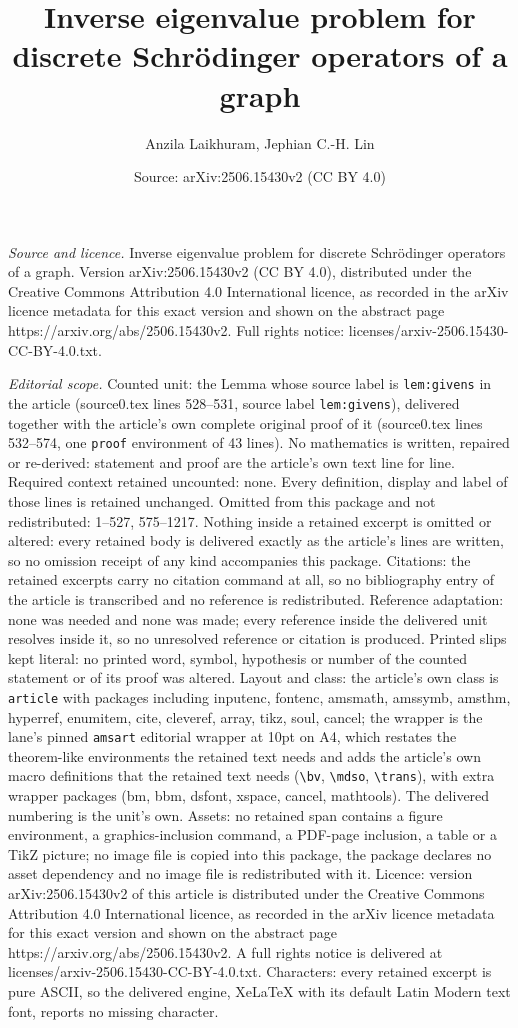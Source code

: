 \documentclass[10pt,a4paper]{amsart}
\title[Inverse eigenvalue problem for discrete Schr\"odinger operat]{Inverse eigenvalue problem for discrete Schr\"odinger operators of a graph}
\author{Anzila Laikhuram, Jephian C.-H. Lin}
\date{Source: arXiv:2506.15430v2 (CC BY 4.0)}
\begin{document}
\maketitle

\noindent\emph{Source and licence.} Inverse eigenvalue problem for discrete Schr\"odinger operators of a graph. Version arXiv:2506.15430v2 (CC BY 4.0), distributed under the Creative Commons Attribution 4.0 International licence, as recorded in the arXiv licence metadata for this exact version and shown on the abstract page https://arxiv.org/abs/2506.15430v2. Full rights notice: licenses/arxiv-2506.15430-CC-BY-4.0.txt.\par\smallskip

\noindent\textit{Editorial scope.} Counted unit: the Lemma whose source label is \texttt{lem:givens} in the article (source0.tex lines 528--531, source label \texttt{lem:givens}), delivered together with the article's own complete original proof of it (source0.tex lines 532--574, one \texttt{proof} environment of 43 lines). No mathematics is written, repaired or re-derived: statement and proof are the article's own text line for line. Required context retained uncounted: none. Every definition, display and label of those lines is retained unchanged. Omitted from this package and not redistributed: 1--527, 575--1217. Nothing inside a retained excerpt is omitted or altered: every retained body is delivered exactly as the article's lines are written, so no omission receipt of any kind accompanies this package. Citations: the retained excerpts carry no citation command at all, so no bibliography entry of the article is transcribed and no reference is redistributed. Reference adaptation: none was needed and none was made; every reference inside the delivered unit resolves inside it, so no unresolved reference or citation is produced. Printed slips kept literal: no printed word, symbol, hypothesis or number of the counted statement or of its proof was altered. Layout and class: the article's own class is \texttt{article} with packages including inputenc, fontenc, amsmath, amssymb, amsthm, hyperref, enumitem, cite, cleveref, array, tikz, soul, cancel; the wrapper is the lane's pinned \texttt{amsart} editorial wrapper at 10pt on A4, which restates the theorem-like environments the retained text needs and adds the article's own macro definitions that the retained text needs (\texttt{\textbackslash bv}, \texttt{\textbackslash mdso}, \texttt{\textbackslash trans}), with extra wrapper packages (bm, bbm, dsfont, xspace, cancel, mathtools). The delivered numbering is the unit's own. Assets: no retained span contains a figure environment, a graphics-inclusion command, a PDF-page inclusion, a table or a TikZ picture; no image file is copied into this package, the package declares no asset dependency and no image file is redistributed with it. Licence: version arXiv:2506.15430v2 of this article is distributed under the Creative Commons Attribution 4.0 International licence, as recorded in the arXiv licence metadata for this exact version and shown on the abstract page https://arxiv.org/abs/2506.15430v2. A full rights notice is delivered at licenses/arxiv-2506.15430-CC-BY-4.0.txt. Characters: every retained excerpt is pure ASCII, so the delivered engine, XeLaTeX with its default Latin Modern text font, reports no missing character.
\end{document}
